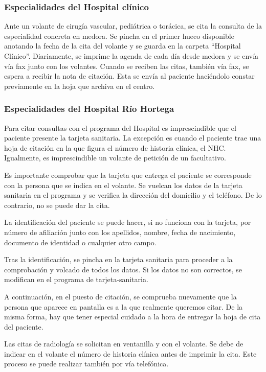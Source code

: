 \subsubsection{Especialidades del Hospital clínico}

Ante un \gls{volante} de cirugía vascular, pediátrica o torácica, se cita la consulta de la especialidad concreta en \Gls{medora}.
Se pincha en el primer hueco disponible anotando la fecha de la cita del \gls{volante} y se guarda en la carpeta ``Hospital Clínico''.
Diariamente, se imprime la agenda de cada día desde \Gls{medora} y se envía vía fax junto con los volantes.
Cuando se reciben las citas, también vía fax, se espera a recibir la nota de citación.
Esta se envía al paciente haciéndolo constar previamente en la hoja que archiva en el centro.

\subsubsection{Especialidades del Hospital Río Hortega}

Para citar consultas con el programa del Hospital es imprescindible que el paciente presente la tarjeta sanitaria.
La excepción es cuando el paciente trae una hoja de citación en la que figura el número de historia clínica, el NHC.
Igualmente, es imprescindible un \gls{volante} de petición de un facultativo.

Es importante comprobar que la tarjeta que entrega el paciente se corresponde con la persona que se indica en el \gls{volante}.
Se vuelcan los datos de la tarjeta sanitaria en el programa y se verifica la dirección del domicilio y el teléfono. De lo contrario, no se puede dar la cita.

La identificación del paciente se puede hacer, si no funciona con la tarjeta, por número de afiliación junto con los apellidos, nombre, fecha de nacimiento, documento de identidad o cualquier otro campo.

Tras la identificación, se pincha en la tarjeta sanitaria para proceder a la comprobación y volcado de todos los datos.
Si los datos no son correctos, se modifican en el programa de \Gls{tarjeta-sanitaria}.

A continuación, en el puesto de citación, se comprueba nuevamente que la persona que aparece en pantalla es a la que realmente queremos citar.
De la misma forma, hay que tener especial cuidado a la hora de entregar la hoja de cita del paciente.

Las citas de radiología se solicitan en ventanilla y con el \gls{volante}.
Se debe de indicar en el \gls{volante} el número de historia clínica antes de imprimir la cita.
Este proceso se puede realizar también por vía telefónica.

